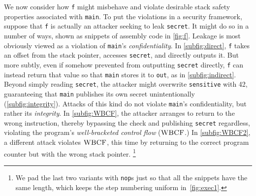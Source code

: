 \documentclass[10pt,conference]{ieeetran}%
\theoremstyle{definition}
\begin{document}
We now consider how {\tt f} might misbehave and violate desirable
stack safety properties associated with {\tt main}. To put the violations in a
security framework, suppose that {\tt f} is actually an attacker seeking
to leak {\tt secret}. It might do so in a number of ways, shown as snippets of
assembly code in \cref{fig:f}.
%
Leakage is most obviously viewed as a violation of {\tt main}'s {\it confidentiality}.
In \cref{subfig:direct}, {\tt f} takes an offset from the stack
pointer, accesses {\tt secret}, and directly outputs it. But more
subtly, even if somehow prevented from outputting {\tt secret} directly, {\tt f}
can instead return that value so that {\tt main} stores it to {\tt out},
as in \cref{subfig:indirect}.
%
Beyond simply reading {\tt secret}, the attacker might overwrite {\tt sensitive}
with 42, guaranteeing that {\tt main} publishes its own secret unintentionally
(\cref{subfig:integrity}).
Attacks of this kind do not violate {\tt main}'s confidentiality, but
rather its {\it integrity}.
In \cref{subfig:WBCF}, the attacker arranges to return to the
wrong instruction, thereby bypassing the check and publishing {\tt secret} regardless,
violating the program's {\it well-bracketed control flow} (\(\textnormal{\sc WBCF}\).)
%
In \cref{subfig:WBCF2}, a different attack violates \(\textnormal{\sc WBCF}\), this time
by returning to the correct program counter but with the wrong stack pointer.%
\footnote{We pad the last two variants with {\tt nop}s just so that all the
snippets have the same length, which keeps the step numbering uniform in~\cref{fig:exec1}.}
\end{document}
